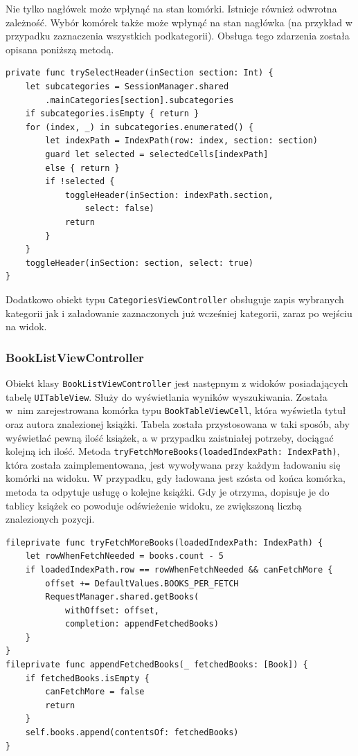 \documentclass[twoside]{projektInzynierskiMS}
\begin{document}
Nie tylko nagłówek może wpłynąć na stan komórki. Istnieje również odwrotna zależność. Wybór komórek także może wpłynąć na stan nagłówka (na przykład w przypadku zaznaczenia wszystkich podkategorii). Obsługa tego zdarzenia została opisana poniższą metodą.
\begin{verbatim}
private func trySelectHeader(inSection section: Int) {
    let subcategories = SessionManager.shared
        .mainCategories[section].subcategories
    if subcategories.isEmpty { return }
    for (index, _) in subcategories.enumerated() {
        let indexPath = IndexPath(row: index, section: section)
        guard let selected = selectedCells[indexPath]
        else { return }
        if !selected {
            toggleHeader(inSection: indexPath.section,
                select: false)
            return
        }
    }
    toggleHeader(inSection: section, select: true)
}
\end{verbatim}

Dodatkowo obiekt typu \verb`CategoriesViewController` obsługuje zapis wybranych kategorii jak i załadowanie zaznaczonych już wcześniej kategorii, zaraz po wejściu na widok. 


\subsubsection{BookListViewController}

Obiekt klasy \verb`BookListViewController` jest następnym z widoków posiadających tabelę \verb`UITableView`. Służy do wyświetlania wyników wyszukiwania. Została w~nim zarejestrowana komórka typu \verb`BookTableViewCell`, która wyświetla tytuł oraz autora znalezionej książki. Tabela została przystosowana w taki sposób, aby wyświetlać pewną ilość książek, a w przypadku zaistniałej potrzeby, dociągać kolejną ich ilość. Metoda \verb`tryFetchMoreBooks(loadedIndexPath: IndexPath)`, która została zaimplementowana, jest wywoływana przy każdym ładowaniu się komórki na widoku. W przypadku, gdy ładowana jest szósta od końca komórka, metoda ta odpytuje usługę o kolejne książki. Gdy je otrzyma, dopisuje je do tablicy książek co powoduje odświeżenie widoku, ze zwiększoną liczbą znalezionych pozycji.
\begin{verbatim}
fileprivate func tryFetchMoreBooks(loadedIndexPath: IndexPath) {
    let rowWhenFetchNeeded = books.count - 5
    if loadedIndexPath.row == rowWhenFetchNeeded && canFetchMore {
        offset += DefaultValues.BOOKS_PER_FETCH
        RequestManager.shared.getBooks(
            withOffset: offset,
            completion: appendFetchedBooks)
    }
}
fileprivate func appendFetchedBooks(_ fetchedBooks: [Book]) {
    if fetchedBooks.isEmpty {
        canFetchMore = false
        return
    }
    self.books.append(contentsOf: fetchedBooks)
}
\end{verbatim}
\end{document}
